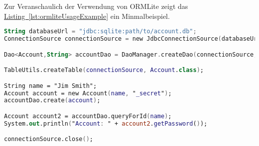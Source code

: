 Zur Veranschaulich der Verwendung von ORMLite zeigt das \hyperref[lst:ormliteUsageExample]{Listing~\ref{lst:ormliteUsageExample}} ein Minmalbeispiel.
\begin{lstlisting}[style=lstStyleFramed, language=Kotlin, caption={Beispiel: Verwendung von ORMLite (verändert nach \cite{ormlite})}, label=lst:ormliteUsageExample, float]
String databaseUrl = "jdbc:sqlite:path/to/account.db";
ConnectionSource connectionSource = new JdbcConnectionSource(databaseUrl);

Dao<Account,String> accountDao = DaoManager.createDao(connectionSource, Account.class);

TableUtils.createTable(connectionSource, Account.class);

String name = "Jim Smith";
Account account = new Account(name, "_secret");
accountDao.create(account);

Account account2 = accountDao.queryForId(name);
System.out.println("Account: " + account2.getPassword());

connectionSource.close();
\end{lstlisting}

